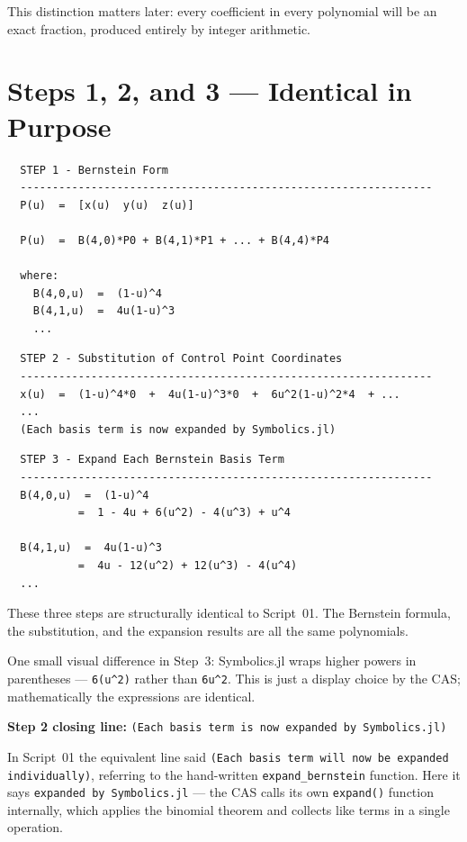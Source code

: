 \documentclass[12pt, a4paper]{article}
\newcommand{\cd}[1]{\texttt{#1}}
\begin{document}
This distinction matters later: every coefficient in every
polynomial will be an exact fraction, produced entirely by
integer arithmetic.


\section{Steps 1, 2, and 3 --- Identical in Purpose}

\begin{verbatim}
  STEP 1 - Bernstein Form
  ----------------------------------------------------------------
  P(u)  =  [x(u)  y(u)  z(u)]

  P(u)  =  B(4,0)*P0 + B(4,1)*P1 + ... + B(4,4)*P4

  where:
    B(4,0,u)  =  (1-u)^4
    B(4,1,u)  =  4u(1-u)^3
    ...
\end{verbatim}

\begin{verbatim}
  STEP 2 - Substitution of Control Point Coordinates
  ----------------------------------------------------------------
  x(u)  =  (1-u)^4*0  +  4u(1-u)^3*0  +  6u^2(1-u)^2*4  + ...
  ...
  (Each basis term is now expanded by Symbolics.jl)
\end{verbatim}

\begin{verbatim}
  STEP 3 - Expand Each Bernstein Basis Term
  ----------------------------------------------------------------
  B(4,0,u)  =  (1-u)^4
           =  1 - 4u + 6(u^2) - 4(u^3) + u^4

  B(4,1,u)  =  4u(1-u)^3
           =  4u - 12(u^2) + 12(u^3) - 4(u^4)
  ...
\end{verbatim}

These three steps are structurally identical to Script~01.
The Bernstein formula, the substitution, and the expansion results
are all the same polynomials.

One small visual difference in Step~3: Symbolics.jl wraps
higher powers in parentheses --- \cd{6(u\^{}2)} rather than \cd{6u\^{}2}.
This is just a display choice by the CAS; mathematically the
expressions are identical.

\begin{notebox}
\textbf{Step 2 closing line:}
\cd{(Each basis term is now expanded by Symbolics.jl)}

In Script~01 the equivalent line said
\cd{(Each basis term will now be expanded individually)},
referring to the hand-written \cd{expand\_bernstein} function.
Here it says \cd{expanded by Symbolics.jl} ---
the CAS calls its own \cd{expand()} function internally,
which applies the binomial theorem and collects like terms
in a single operation.
\end{notebox}
\end{document}
